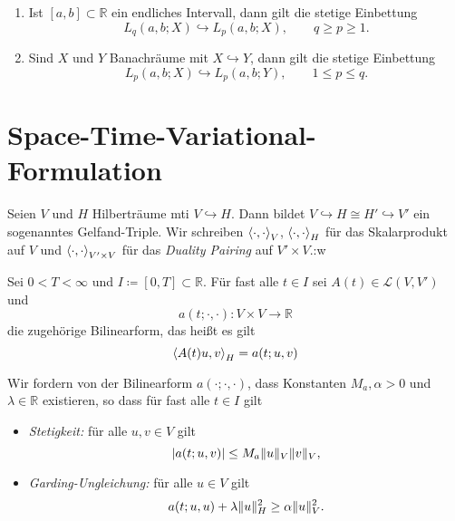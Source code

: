 \begin{Lemma}[Eigenschaften]
    \begin{enumerate}
        \item Ist $[a, b] \subset \mathbb{R}$ ein endliches Intervall, dann gilt die stetige Einbettung
        \begin{equation}
            L_{q}(a, b; X) \hookrightarrow L_{p}(a, b; X), \qquad q \geq p \geq 1.
        \end{equation}
        \item Sind $X$ und $Y$ Banachräume mit $X \hookrightarrow Y$, dann gilt die stetige Einbettung
        \begin{equation}
            L_{p}(a, b; X) \hookrightarrow L_{p}(a, b; Y), \qquad 1 \leq p \leq q.
        \end{equation}
    \end{enumerate}
\end{Lemma}


\section{Space-Time-Variational-Formulation} %
\label{sec:space_time_variational_formulation}

Seien $V$ und $H$ Hilberträume mti $V \hookrightarrow H$.
Dann bildet $V \hookrightarrow H \cong H' \hookrightarrow V'$ ein sogenanntes
Gelfand-Triple.
Wir schreiben $\left\langle\cdot,\cdot\right\rangle_{V}$, $\left\langle\cdot,\cdot\right\rangle_{H}$ für das
Skalarprodukt auf $V$ und $\left\langle\cdot,\cdot\right\rangle_{V' \times V}$ für das
\emph{Duality Pairing} auf $V' \times V$.:w

Sei $0 < T < \infty$ und $I \coloneqq [0, T] \subset \mathbb{R}$.
Für fast alle $t \in I$ sei $A(t) \in \mathcal L(V, V')$ und
\begin{equation}
    a(t; \cdot, \cdot) \colon V \times V \to \mathbb{R}
\end{equation}
die zugehörige Bilinearform, das heißt es gilt
\begin{equation}
    \left\langle A(t)u,v\right\rangle_{H} = a(t; u, v)
\end{equation}

Wir fordern von der Bilinearform $a(\cdot; \cdot, \cdot)$, dass Konstanten $M_a,
\alpha > 0$ und $\lambda \in \mathbb{R}$ existieren, so dass für fast alle $t
\in I$ gilt
\begin{itemize}
    \item \emph{Stetigkeit:} für alle $u, v \in V$ gilt
        \begin{equation}
            \label{eq:stetigkeit}
            \lvert a(t; u, v)\rvert \leq M_a \lVert u\rVert_V \lVert v\rVert_V,
        \end{equation}
    \item \emph{Garding-Ungleichung:} für alle $u \in V$ gilt
        \begin{equation}
            \label{eq:garding-inequality}
            a(t; u, u) + \lambda \lVert u\rVert^2_H \geq \alpha \lVert u\rVert^2_V.
        \end{equation}
\end{itemize}

